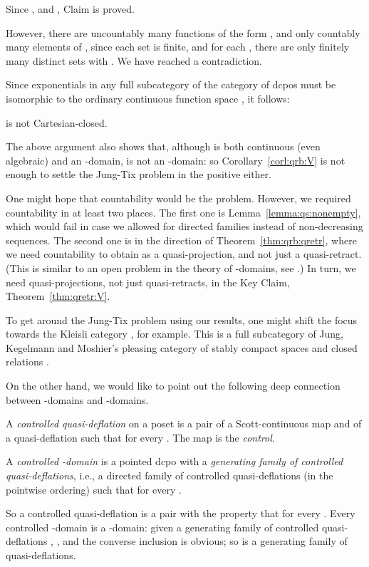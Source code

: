 \documentclass{LMCS}
\begin{document}
Since , and , Claim  is proved.

However, there are uncountably many functions of the form ,
and only countably many elements of , since each set  is
finite, and for each , there are only finitely many
distinct sets  with .  We have
reached a contradiction.

Since exponentials in any full subcategory of the category of dcpos
must be isomorphic to the ordinary continuous function space
\cite{Smyth:CCC}, it follows:
\begin{prop}
   is not Cartesian-closed.
\end{prop}
The above argument also shows that, although  is both continuous
(even algebraic) and an -domain,  is not an
-domain: so Corollary~\ref{corl:qrb:V} is not enough to settle
the Jung-Tix problem in the positive either.

One might hope that countability would be the problem.  However, we
required countability in at least two places.  The first one is
Lemma~\ref{lemma:qs:nonempty}, which would fail in case we allowed for
directed families  instead of non-decreasing
sequences.  The second one is in the  direction of
Theorem~\ref{thm:qrb:qretr}, where we need countability to obtain 
as a quasi-projection, and not just a quasi-retract.  (This is similar
to an open problem in the theory of -domains, see \cite[Remark
after Theorem~4.9]{Jung:CCC}.)  In turn, we need quasi-projections,
not just quasi-retracts, in the Key Claim, Theorem~\ref{thm:qretr:V}.

To get around the Jung-Tix problem using our results, one might shift
the focus towards the Kleisli category , for
example.  This is a full subcategory of Jung, Kegelmann and Moshier's
pleasing category  of stably compact spaces and closed
relations \cite{DBLP:journals/entcs/JungKM01}.

On the other hand, we would like to point out the following deep
connection between -domains and -domains.
\begin{defi}
  \label{defi:ctrlQRB}
  A {\em controlled quasi-deflation\/} on a poset  is a pair of a
  Scott-continuous map  and of a quasi-deflation  such that  for
  every .  The map  is the {\em control\/}.

  A {\em controlled -domain\/} is a pointed dcpo  with a {\em
    generating family of controlled quasi-deflations\/}, i.e., a
  directed family of controlled quasi-deflations (in the pointwise
  ordering)  such that  for every .
\end{defi}
So a controlled quasi-deflation is a pair  with the
property that  for
every .  Every controlled -domain is a -domain:
given a generating family of controlled quasi-deflations , , and the converse inclusion  is obvious; so
 is a generating family of quasi-deflations.
\end{document}
